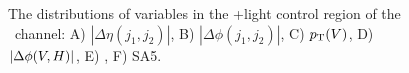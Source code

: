 \begin{figure}[htbp]
{    
  }
  \caption[Additional \bosZ+light Control Region Distributions for the \ZnnH\ Channel]{The distributions of variables in the \bosZ+light control region of the \ZnnH\ channel: A) $\left| \Delta \eta (j_{1}, j_{2}) \right|$, B) $\left| \Delta \phi (j_{1}, j_{2}) \right|$, C) $p_{\mathrm{T}}(V)$, D) $\left| \Delta \phi (V, H) \right|$, E) \pTmiss, F) SA5.}
  \label{fig:CR_Znn_ZLF_2}
\end{figure}

\clearpage


